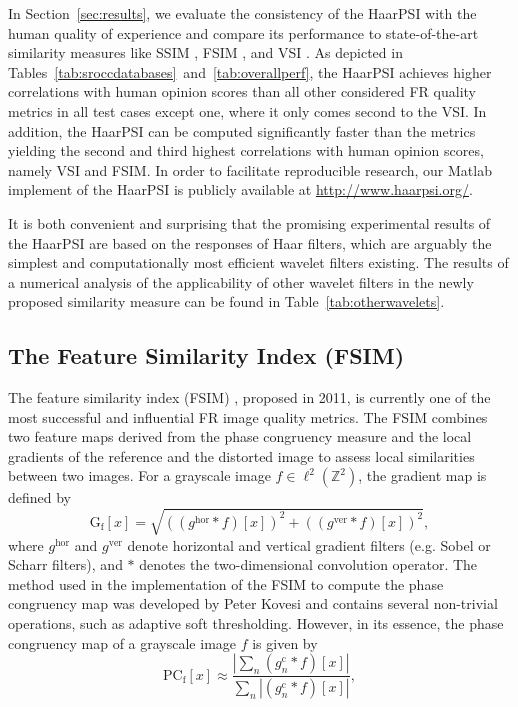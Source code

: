 \documentclass[11pt,a4paper]{article}
\newcommand{\bZ}{\mathbb{Z}}
\newcommand{\abs}[1]{\left\vert#1\right\vert}
\begin{document}
In Section~\ref{sec:results}, we evaluate the consistency of the HaarPSI with the human
quality of experience and compare its performance to state-of-the-art similarity
measures like SSIM \cite{WBSS2004}, FSIM \cite{ZZMZ2011}, and VSI
\cite{ZSL2014}. As depicted in
Tables~\ref{tab:sroccdatabases}~and~\ref{tab:overallperf}, the HaarPSI achieves
higher correlations with human opinion scores than all other considered FR
quality metrics in all test cases except one, where it only comes second to the VSI.
In addition, the HaarPSI can be computed significantly faster than the metrics yielding the
second and third highest correlations with human opinion scores, namely VSI and
FSIM.    
In  order  to  facilitate reproducible research, our Matlab implement of the HaarPSI is publicly available
at \url{http://www.haarpsi.org/}.

It is both convenient and surprising that the promising experimental results of the HaarPSI are based on the responses of Haar filters,
which are arguably the simplest and computationally most efficient wavelet filters existing. The results of a numerical analysis of the applicability
of other wavelet filters in the newly proposed similarity measure can be found in Table~\ref{tab:otherwavelets}.  



\subsection{The Feature Similarity Index (FSIM)}
The feature similarity index (FSIM) \cite{ZZMZ2011}, proposed in 2011, is currently one of the most successful and influential FR image quality metrics. The FSIM combines two feature maps derived from the phase congruency measure \cite{Kov2000} and the local gradients of the reference and the distorted image to assess local similarities between two images. For a grayscale image $f\in\ell^2(\bZ^2)$, the gradient map is defined by  
\begin{equation}
\label{eq:grad}
\operatorname{G_f}[x] = \sqrt{\left((g^{\text{hor}}*f)[x]\right)^2 + \left((g^{\text{ver}}*f)[x]\right)^2},
\end{equation}
where $g^{\text{hor}}$ and $g^{\text{ver}}$ denote horizontal and vertical gradient filters (e.g. Sobel or Scharr filters), and $*$ denotes the two-dimensional convolution operator. The method used in the implementation of the FSIM to compute the phase congruency map was developed by Peter Kovesi \cite{KovONLINE} and contains several non-trivial operations, such as adaptive soft thresholding. However, in its essence, the phase congruency map of a grayscale image $f$ is given by 
\begin{equation}
\label{eq:pc}
\operatorname{PC_{f}}[x] \approx \frac{\abs{\sum_n (g^\text{c}_n*f)[x]}}{\sum_n\abs{(g^\text{c}_n*f)[x]}},
\end{equation}
\end{document}
